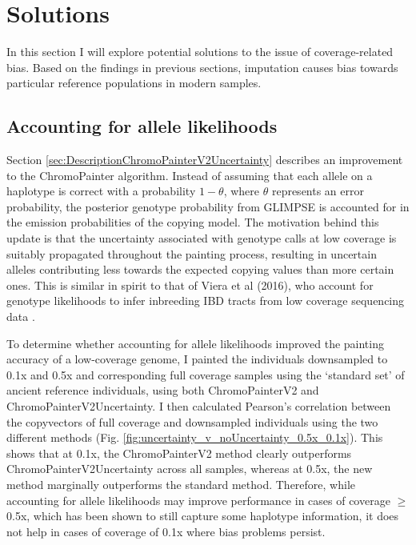 {\section{Solutions} \label{sec:Solutions}

In this section I will explore potential solutions to the issue of coverage-related bias. Based on the findings in previous sections, imputation causes bias towards particular reference populations in modern samples.  

\subsection{Accounting for allele likelihoods}

Section \ref{sec:DescriptionChromoPainterV2Uncertainty} describes an improvement to the ChromoPainter algorithm. Instead of assuming that each allele on a haplotype is correct with a probability $1-\theta$, where $\theta$ represents an error probability, the posterior genotype probability from GLIMPSE is accounted for in the emission probabilities of the copying model. The motivation behind this update is that the uncertainty associated with genotype calls at low coverage is suitably propagated throughout the painting process, resulting in uncertain alleles contributing less towards the expected copying values than more certain ones. This is similar in spirit to that of Viera et al (2016), who account for genotype likelihoods to infer inbreeding IBD tracts from low coverage sequencing data \cite{vieira2016estimating}.

To determine whether accounting for allele likelihoods improved the painting accuracy of a low-coverage genome, I painted the individuals downsampled to 0.1x and 0.5x and corresponding full coverage samples using the `standard set' of ancient reference individuals, using both ChromoPainterV2 and ChromoPainterV2Uncertainty. I then calculated Pearson's correlation between the copyvectors of full coverage and downsampled individuals using the two different methods (Fig. \ref{fig:uncertainty_v_noUncertainty_0.5x_0.1x}). This shows that at 0.1x, the ChromoPainterV2 method clearly outperforms ChromoPainterV2Uncertainty across all samples, whereas at 0.5x, the new method marginally outperforms the standard method. Therefore, while accounting for allele likelihoods may improve performance in cases of coverage $\geq$0.5x, which has been shown to still capture some haplotype information, it does not help in cases of coverage of 0.1x where bias problems persist.


}
